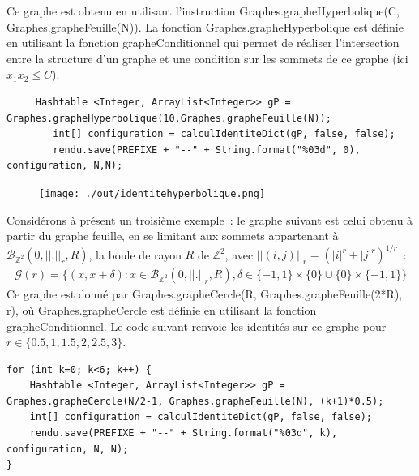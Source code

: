 \documentclass{article}
\begin{document}
Ce graphe est obtenu en utilisant l'instruction \textup{Graphes.grapheHyperbolique(C, Graphes.grapheFeuille(N))}. La fonction \textup{Graphes.grapheHyperbolique} est définie en utilisant la fonction \textup{grapheConditionnel} qui permet de réaliser l'intersection entre la structure d'un graphe et une condition sur les sommets de ce graphe (ici $x_1x_2\leq C$).
\begin{lstlisting}
     Hashtable <Integer, ArrayList<Integer>> gP = Graphes.grapheHyperbolique(10,Graphes.grapheFeuille(N));
        int[] configuration = calculIdentiteDict(gP, false, false);
        rendu.save(PREFIXE + "--" + String.format("%03d", 0), configuration, N,N);
\end{lstlisting}
\begin{figure}[h]
	\centering
	\texttt{[image: ./out/identitehyperbolique.png]}
\end{figure}
Considérons à présent un troisième exemple : le graphe suivant est celui obtenu à partir du graphe feuille, en se limitant aux sommets appartenant à $\mathcal{B}_{\mathbb{Z}^2}(0,||.||_r,R)$, la boule de rayon $R$ de $\mathbb{Z}^2$, avec $||(i,j)||_r= (|i|^r+|j|^r)^{1/r}$ :
\begin{align*}
	\mathcal{G}(r) = \{(x,x+\delta) : x\in\mathcal{B}_{\mathbb{Z}^2}(0,||.||_r, R), \delta\in\{-1,1\}\times\{0\}\cup\{0\}\times\{-1,1\}\}
\end{align*}
Ce graphe est donné par \textup{Graphes.grapheCercle(R, Graphes.grapheFeuille(2*R), r)}, où \textup{Graphes.grapheCercle} est définie en utilisant la fonction \textup{grapheConditionnel}. Le code suivant renvoie les identités sur ce graphe pour $r \in\{0.5, 1, 1.5, 2, 2.5, 3\}$. 
\begin{lstlisting}
for (int k=0; k<6; k++) {
	Hashtable <Integer, ArrayList<Integer>> gP = Graphes.grapheCercle(N/2-1, Graphes.grapheFeuille(N), (k+1)*0.5);
	int[] configuration = calculIdentiteDict(gP, false, false);
	rendu.save(PREFIXE + "--" + String.format("%03d", k), configuration, N, N);
}
\end{lstlisting}
\begin{figure}[h]
\centering
{}
\qquad
{}
\qquad
{}
\qquad
{}
\qquad
\newline
{}
\qquad
{}
\end{figure}
\newpage
\end{document}
